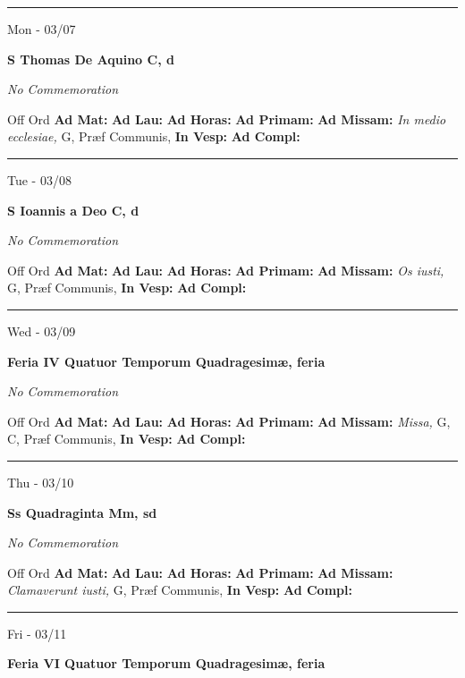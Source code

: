 \documentclass[letterpaper, 10pt]{article}
\begin{document}
\hrule
\begin{center}
Mon - 03/07
\end{center}\textbf{ \large S Thomas De Aquino C, \textnormal{\normalsize d}}

\textit{No Commemoration}\begin{justify}
Off Ord
\textbf{Ad Mat: }
\textbf{Ad Lau: }
\textbf{Ad Horas: }
\textbf{Ad Primam: }
\textbf{Ad Missam:} \textit{In medio ecclesiae, } G, Præf Communis, 
\textbf{In Vesp: }
\textbf{Ad Compl: }\end{justify}



\hrule
\begin{center}
Tue - 03/08
\end{center}\textbf{ \large S Ioannis a Deo C, \textnormal{\normalsize d}}

\textit{No Commemoration}\begin{justify}
Off Ord
\textbf{Ad Mat: }
\textbf{Ad Lau: }
\textbf{Ad Horas: }
\textbf{Ad Primam: }
\textbf{Ad Missam:} \textit{Os iusti, } G, Præf Communis, 
\textbf{In Vesp: }
\textbf{Ad Compl: }\end{justify}



\hrule
\begin{center}
Wed - 03/09
\end{center}\textbf{ \large Feria IV Quatuor Temporum Quadragesimæ, \textnormal{\normalsize feria}}

\textit{No Commemoration}\begin{justify}
Off Ord
\textbf{Ad Mat: }
\textbf{Ad Lau: }
\textbf{Ad Horas: }
\textbf{Ad Primam: }
\textbf{Ad Missam:} \textit{Missa, } G, C, Præf Communis, 
\textbf{In Vesp: }
\textbf{Ad Compl: }\end{justify}



\hrule
\begin{center}
Thu - 03/10
\end{center}\textbf{ \large Ss Quadraginta Mm, \textnormal{\normalsize sd}}

\textit{No Commemoration}\begin{justify}
Off Ord
\textbf{Ad Mat: }
\textbf{Ad Lau: }
\textbf{Ad Horas: }
\textbf{Ad Primam: }
\textbf{Ad Missam:} \textit{Clamaverunt iusti, } G, Præf Communis, 
\textbf{In Vesp: }
\textbf{Ad Compl: }\end{justify}



\hrule
\begin{center}
Fri - 03/11
\end{center}\textbf{ \large Feria VI Quatuor Temporum Quadragesimæ, \textnormal{\normalsize feria}}
\end{document}
